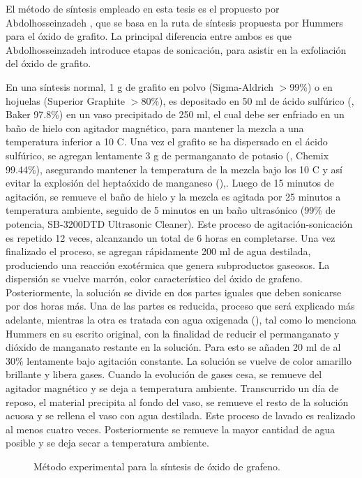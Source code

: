 El método de síntesis empleado en esta tesis es el propuesto por Abdolhosseinzadeh \citep{Abdolhosseinzadeh2015}, que se basa en la ruta de síntesis propuesta por Hummers para el óxido de grafito. La principal diferencia entre ambos es que Abdolhosseinzadeh introduce etapas de sonicación, para asistir en la exfoliación del óxido de grafito.

En una síntesis normal, 1 g de grafito en polvo (Sigma-Aldrich $>$99\%) o en hojuelas (Superior Graphite $>$80\%), es depositado en 50 ml de ácido sulfúrico (, Baker 97.8\%) en un vaso precipitado de 250 ml, el cual debe ser enfriado en un baño de hielo con agitador magnético, para mantener la mezcla a una temperatura inferior a 10 \degree C. Una vez el grafito se ha dispersado en el ácido sulfúrico, se agregan lentamente 3 g de permanganato de potasio (, Chemix 99.44\%), asegurando mantener la temperatura de la mezcla bajo los 10 C y así evitar la explosión del heptaóxido de manganeso (),\citep{Dreyer2010}. Luego de 15 minutos de agitación, se remueve el baño de hielo y la mezcla es agitada por 25 minutos a temperatura ambiente, seguido de 5 minutos en un baño ultrasónico (99\% de potencia, SB-3200DTD Ultrasonic Cleaner). Este proceso de agitación-sonicación es repetido 12 veces, alcanzando un total de 6 horas en completarse. Una vez finalizado el proceso, se agregan rápidamente 200 ml de agua destilada, produciendo una reacción exotérmica que genera subproductos gaseosos. La dispersión se vuelve marrón, color característico del óxido de grafeno. Posteriormente, la solución se divide en dos partes iguales que deben sonicarse por dos horas más. Una de las partes es reducida, proceso que será explicado más adelante, mientras la otra es tratada con agua oxigenada (), tal como lo menciona Hummers en su escrito original, con la finalidad de reducir el permanganato y dióxido de manganato restante en la solución. Para esto se añaden 20 ml de  al 30\% lentamente bajo agitación constante. La solución se vuelve de color amarillo brillante y libera gases. Cuando la evolución de gases cesa, se remueve del agitador magnético y se deja a temperatura ambiente. Transcurrido un día de reposo, el material precipita al fondo del vaso, se remueve el resto de la solución acuosa y se rellena el vaso con agua destilada. Este proceso de lavado es realizado al menos cuatro veces. Posteriormente se remueve la mayor cantidad de agua posible y se deja secar a temperatura ambiente.

\begin{figure}
	\centering
	\caption[Método experimental para la síntesis de óxido de grafeno]{Método experimental para la síntesis de óxido de grafeno.}
\end{figure}


